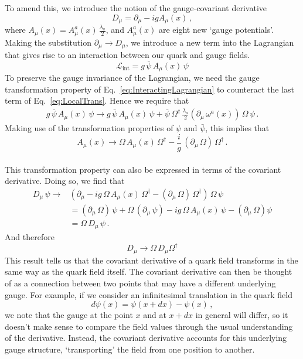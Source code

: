 %
To amend this, we introduce the notion of the gauge-covariant derivative
%
\begin{equation}
D_\mu = \partial_\mu - ig A_\mu(x)\, ,
\end{equation}
%
where $A_\mu(x)=A_\mu^a(x)\,\frac{\lambda_a}{2}$, and $A_\mu^a(x)$ are eight new `gauge potentials'. Making the substitution $\partial_\mu\rightarrow D_\mu$, we introduce a new term into the Lagrangian that gives rise to an interaction between our quark and gauge fields.
%
\begin{equation}
\mathcal{L}_\text{int} = g\,\bar{\psi}\,A_\mu(x)\,\psi
\label{eq:InteractingLagrangian}
\end{equation}
%
To preserve the gauge invariance of the Lagrangian, we need the gauge transformation property of Eq.~\ref{eq:InteractingLagrangian} to counteract the last term of Eq.~\ref{eq:LocalTrans}. Hence we require that
%
\begin{align}
g\,\bar{\psi}\,A_\mu(x)\,\psi \rightarrow g\,\bar{\psi}\,A_\mu(x)\,\psi + \bar{\psi}\,\Omega^\dag\,\frac{\lambda_a}{2}(\partial_\mu\,\omega^a(x))\,\Omega\,\psi\, .
\end{align}
%
Making use of the transformation properties of $\psi$ and $\bar{\psi}$, this implies that
%
\begin{equation}
A_\mu(x)\rightarrow \Omega\,A_\mu(x)\,\Omega^\dag - \frac{i}{g}\,(\partial_\mu\,\Omega)\,\Omega^\dag\, . 
\end{equation}\\
%

This transformation property can also be expressed in terms of the covariant derivative. Doing so, we find that
%
\begin{align*}
D_\mu\,\psi \rightarrow &\left(\partial_\mu -ig\,\Omega\,A_\mu(x)\,\Omega^\dag - (\partial_\mu\,\Omega)\,\Omega^\dag\right)\,\Omega\,\psi\\
&= (\partial_\mu\,\Omega)\,\psi + \Omega\,(\partial_\mu\,\psi) - ig\,\Omega\,A_\mu(x)\,\psi - (\partial_\mu\,\Omega)\psi\\
&=\Omega\,D_\mu\,\psi\, .
\end{align*}
%
And therefore
%
\begin{equation}
D_{\mu}\rightarrow\Omega\,D_\mu \Omega^\dag
\end{equation}
%
This result tells us that the covariant derivative of a quark field transforms in the same way as the quark field itself. The covariant derivative can then be thought of as a connection between two points that may have a different underlying gauge. For example, if we consider an infinitesimal translation in the quark field
%
\begin{equation*}
d\psi(x) = \psi(x+dx)-\psi(x)\, ,
\end{equation*} 
%
we note that the gauge at the point $x$ and at $x+dx$ in general will differ, so it doesn't make sense to compare the field values through the usual understanding of the derivative. Instead, the covariant derivative accounts for this underlying gauge structure, `transporting' the field from one position to another.\\

